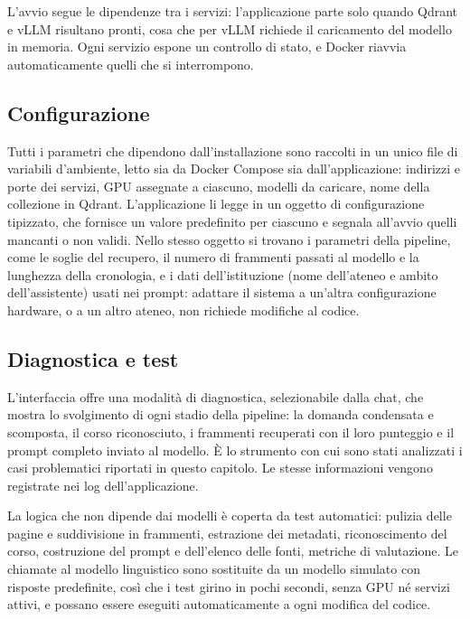 L'avvio segue le dipendenze tra i servizi: l'applicazione parte solo quando Qdrant e vLLM risultano pronti, cosa che
per vLLM richiede il caricamento del modello in memoria. Ogni servizio espone un controllo di stato, e Docker
riavvia automaticamente quelli che si interrompono.

\subsection{Configurazione}

Tutti i parametri che dipendono dall'installazione sono raccolti in un unico file di variabili d'ambiente, letto sia
da Docker Compose sia dall'applicazione: indirizzi e porte dei servizi, GPU assegnate a ciascuno, modelli da
caricare, nome della collezione in Qdrant. L'applicazione li legge in un oggetto di configurazione tipizzato, che
fornisce un valore predefinito per ciascuno e segnala all'avvio quelli mancanti o non validi. Nello stesso oggetto
si trovano i parametri della pipeline, come le soglie del recupero, il numero di frammenti passati al modello e la
lunghezza della cronologia, e i dati dell'istituzione (nome dell'ateneo e ambito dell'assistente) usati nei prompt:
adattare il sistema a un'altra configurazione hardware, o a un altro ateneo, non richiede modifiche al codice.

\subsection{Diagnostica e test}

L'interfaccia offre una modalità di diagnostica, selezionabile dalla chat, che mostra lo svolgimento di ogni stadio
della pipeline: la domanda condensata e scomposta, il corso riconosciuto, i frammenti recuperati con il loro
punteggio e il prompt completo inviato al modello. È lo strumento con cui sono stati analizzati i casi problematici
riportati in questo capitolo. Le stesse informazioni vengono registrate nei log dell'applicazione.

La logica che non dipende dai modelli è coperta da test automatici: pulizia delle pagine e suddivisione in
frammenti, estrazione dei metadati, riconoscimento del corso, costruzione del prompt e dell'elenco delle fonti,
metriche di valutazione. Le chiamate al modello linguistico sono sostituite da un modello simulato con risposte
predefinite, così che i test girino in pochi secondi, senza GPU né servizi attivi, e possano essere eseguiti
automaticamente a ogni modifica del codice.
